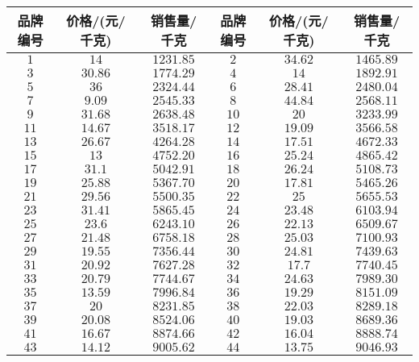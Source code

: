 \documentclass[10pt,a4paper]{article}
\begin{document}
\begin{enumerate}[1.]
\begin{center}
\begin{longtable}{|c|c|c||c|c|c|}
        \hline
        品牌编号 & 价格/(元/千克) & 销售量/千克 & 品牌编号 & 价格/(元/千克) & 销售量/千克\\ \hline
        \endhead
        $1$ & $14$ & $1231.85$ & $2$ & $34.62$ & $1465.89$ \\ \hline
        $3$ & $30.86$ & $1774.29$ & $4$ & $14$ & $1892.91$ \\ \hline
        $5$ & $36$ & $2324.44$ & $6$ & $28.41$ & $2480.04$ \\ \hline
        $7$ & $9.09$ & $2545.33$ & $8$ & $44.84$ & $2568.11$ \\ \hline
        $9$ & $31.68$ & $2638.48$ & $10$ & $20$ & $3233.99$ \\ \hline
        $11$ & $14.67$ & $3518.17$ & $12$ & $19.09$ & $3566.58$ \\ \hline
        $13$ & $26.67$ & $4264.28$ & $14$ & $17.51$ & $4672.33$ \\ \hline
        $15$ & $13$ & $4752.20$ & $16$ & $25.24$ & $4865.42$ \\ \hline
        $17$ & $31.1$ & $5042.91$ & $18$ & $26.24$ & $5108.73$ \\ \hline
        $19$ & $25.88$ & $5367.70$ & $20$ & $17.81$ & $5465.26$ \\ \hline
        $21$ & $29.56$ & $5500.35$ & $22$ & $25$ & $5655.53$ \\ \hline
        $23$ & $31.41$ & $5865.45$ & $24$ & $23.48$ & $6103.94$ \\ \hline
        $25$ & $23.6$ & $6243.10$ & $26$ & $22.13$ & $6509.67$ \\ \hline
        $27$ & $21.48$ & $6758.18$ & $28$ & $25.03$ & $7100.93$ \\ \hline
        $29$ & $19.55$ & $7356.44$ & $30$ & $24.81$ & $7439.63$ \\ \hline
        $31$ & $20.92$ & $7627.28$ & $32$ & $17.7$ & $7740.45$ \\ \hline
        $33$ & $20.79$ & $7744.67$ & $34$ & $24.63$ & $7989.30$ \\ \hline
        $35$ & $13.59$ & $7996.84$ & $36$ & $19.29$ & $8151.09$ \\ \hline
        $37$ & $20$ & $8231.85$ & $38$ & $22.03$ & $8289.18$ \\ \hline
        $39$ & $20.08$ & $8524.06$ & $40$ & $19.03$ & $8689.36$ \\ \hline
        $41$ & $16.67$ & $8874.66$ & $42$ & $16.04$ & $8888.74$ \\ \hline
        $43$ & $14.12$ & $9005.62$ & $44$ & $13.75$ & $9046.93$ \\ \hline

\end{longtable}
\end{center}
\end{enumerate}
\end{document}
